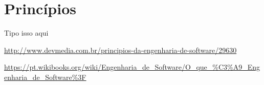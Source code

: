 \chapter{Princípios}

Tipo isso aqui

\url{http://www.devmedia.com.br/principios-da-engenharia-de-software/29630}

\url{https://pt.wikibooks.org/wiki/Engenharia_de_Software/O_que_%C3%A9_Engenharia_de_Software%3F}
